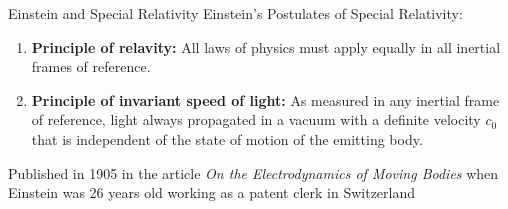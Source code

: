 \documentclass[12pt,aspectratio=169]{beamer}
\begin{document}
\begin{frame}{Einstein and Special Relativity}
  Einstein's Postulates of Special Relativity:
  \begin{enumerate}
  \item\textbf{Principle of relavity:} All laws of physics must apply equally
    in all inertial frames of reference.
  \item\textbf{Principle of invariant speed of light:} As measured in any
    inertial frame of reference, light always propagated in a vacuum with a
    definite velocity $c_0$ that is independent of the state of motion of the
    emitting body.
  \end{enumerate}
  Published in 1905 in the article \emph{On the Electrodynamics of Moving
    Bodies} when Einstein was 26 years old working as a patent clerk in
  Switzerland
\end{frame}
\end{document}
